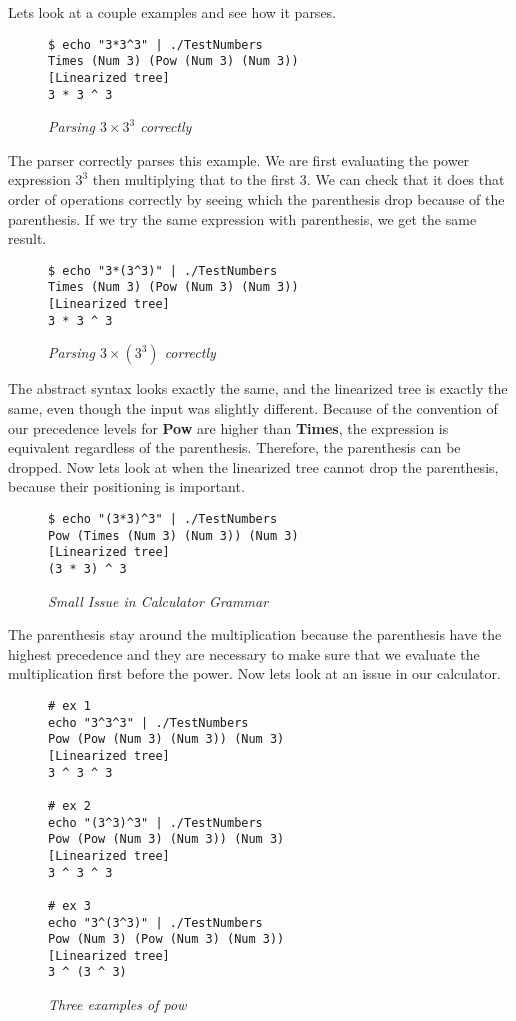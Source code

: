 \documentclass{article}
\begin{document}
\medskip\noindent
Lets look at a couple examples and see how it parses. 

\begin{figure}[H]
    \begin{lstlisting}
$ echo "3*3^3" | ./TestNumbers   
Times (Num 3) (Pow (Num 3) (Num 3))
[Linearized tree]
3 * 3 ^ 3
    \end{lstlisting}
    \caption{\textit{Parsing $3\times3^3$ correctly}}
\end{figure}

\medskip\noindent
The parser correctly parses this example. We are first evaluating the power expression $3^3$ then multiplying that to the first 3. We can check that it does that order of operations correctly by seeing which the parenthesis drop because of the parenthesis. If we try the same expression with parenthesis, we get the same result.

 
 \begin{figure}[H]
    \begin{lstlisting}
$ echo "3*(3^3)" | ./TestNumbers 
Times (Num 3) (Pow (Num 3) (Num 3))
[Linearized tree]
3 * 3 ^ 3
    \end{lstlisting}
    \caption{\textit{Parsing $3\times(3^3)$ correctly}}
\end{figure}

\noindent
The abstract syntax looks exactly the same, and the linearized tree is exactly the same, even though the input was slightly different. Because of the convention of our precedence levels for \textbf{Pow} are higher than \textbf{Times}, the expression is equivalent regardless of the parenthesis. Therefore, the parenthesis can be dropped. Now lets look at when the linearized tree cannot drop the parenthesis, because their positioning is important.

\begin{figure}[H]
    \begin{lstlisting}
$ echo "(3*3)^3" | ./TestNumbers 
Pow (Times (Num 3) (Num 3)) (Num 3)
[Linearized tree]
(3 * 3) ^ 3
    \end{lstlisting}
    \caption{\textit{Small Issue in Calculator Grammar}}
\end{figure}

\noindent
The parenthesis stay around the multiplication because the parenthesis have the highest precedence and they are necessary to make sure that we evaluate the multiplication first before the power. Now lets look at an issue in our calculator.

\begin{figure}[H]
    \begin{lstlisting}
# ex 1
echo "3^3^3" | ./TestNumbers 
Pow (Pow (Num 3) (Num 3)) (Num 3)
[Linearized tree]
3 ^ 3 ^ 3

# ex 2
echo "(3^3)^3" | ./TestNumbers 
Pow (Pow (Num 3) (Num 3)) (Num 3)
[Linearized tree]
3 ^ 3 ^ 3

# ex 3
echo "3^(3^3)" | ./TestNumbers 
Pow (Num 3) (Pow (Num 3) (Num 3))
[Linearized tree]
3 ^ (3 ^ 3)
    \end{lstlisting}
    \caption{\textit{Three examples of pow}}
\end{figure}
\end{document}
